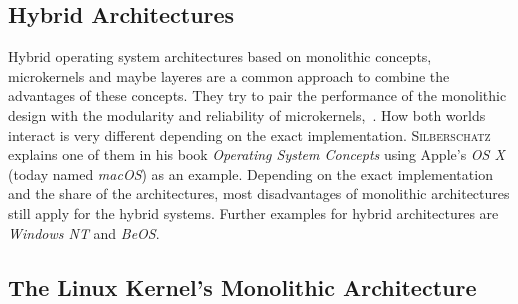 \subsection{Hybrid Architectures}
Hybrid operating system architectures based on monolithic concepts, microkernels and maybe layeres are a common approach to combine the advantages of these concepts.
They try to pair the performance of the monolithic design with the modularity and reliability of microkernels\cite{microkernels},~\cite{silberschatz2009operating}.
How both worlds interact is very different depending on the exact implementation.
\textsc{Silberschatz} explains one of them in his book \textit{Operating System Concepts}\cite{silberschatz2009operating} using Apple's \textit{OS X} (today named \textit{macOS}) as an example.
Depending on the exact implementation and the share of the architectures, most disadvantages of monolithic architectures still apply for the hybrid systems.
Further examples for hybrid architectures are \textit{Windows NT} and \textit{BeOS}\cite{microkernels}.  


\subsection{The Linux Kernel's Monolithic Architecture}


